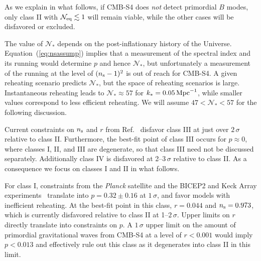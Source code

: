 As we explain in what follows, if CMB-S4 does {\it not\/} detect primordial $B$ modes, only class II with $\mathcal{N}_{\rm eq}\lesssim 1$ will remain viable,
while the other cases will be disfavored or excluded.


The value of $\mathcal{N}_\ast$ depends on the post-inflationary history of the Universe. Equation~(\ref{eq:nsassump}) implies that a measurement of the spectral index and its running would determine $p$ and hence $\mathcal{N}_\ast$, but unfortunately a measurement of the running at the level of $(n_{\rm s}-1)^2$ is out of reach for CMB-S4. A given reheating scenario predicts $\mathcal{N}_\ast$, but the space of reheating scenarios is large. Instantaneous reheating leads to $\mathcal{N}_\ast\approx 57$ for $k_\ast=0.05\,  {\rm Mpc}^{-1}$, while smaller values correspond to less efficient reheating. We will assume $47<\mathcal{N}_\ast<57$ for the following discussion. 


Current constraints on $n_{\rm s}$ and $r$ from Ref.~\cite{Ade:2015tva} disfavor class III at just over $2\,\sigma$ relative to class II. Furthermore, the best-fit point of class III occurs for $p\approx 0$, where classes I, II, and III are degenerate, so that class III need not be discussed separately. Additionally class IV is disfavored at 2--$3\,\sigma$ relative to class II. As a consequence we focus on classes I and II in what follows.

For class I, constraints from the {\it Planck\/} satellite and the BICEP2 and Keck Array experiments~\cite{Ade:2015tva} translate into $p=0.32\pm0.16$ at $1\,\sigma$, and favor models with inefficient reheating. At the best-fit point in this class, $r=0.044$ and $n_{\rm s}=0.973$, which is currently disfavored relative to class II at 1--$2\,\sigma$. Upper limits on $r$ directly translate into constraints on $p$. A $1\,\sigma$ upper limit on the amount of primordial gravitational waves from CMB-S4 at a level of $r<0.001$ would imply $p<0.013$ and effectively rule out this class as it degenerates into class II in this limit. 


